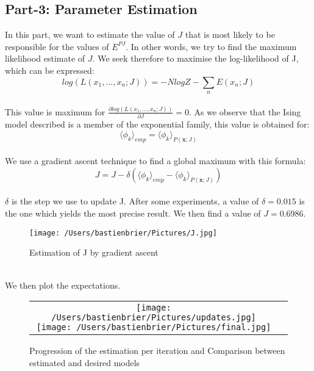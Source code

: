 \documentclass[11pt, oneside]{article}   	%
\begin{document}
	\subsection{Part-3: Parameter Estimation}
		In this part, we want to estimate the value of $J$ that is most likely to be responsible for the values of $E^{PJ}$. In other words, we try to find the maximum likelihood estimate of $J$. We seek therefore to maximise the log-likelihood of J, which can be expressed:
		\[log(L(x_1, ... , x_n;J))= -NlogZ - \sum_nE(x_n;J)\]
		\\ This value is maximum for $\frac{\partial log(L(x_1, ... , x_n;J))}{\partial J} = 0$. As we observe that the Ising model described is a member of the exponential family, this value is obtained for:
		\[\langle \phi_k\rangle_{emp} = \langle \phi_k\rangle_{P(\mathbf x;J)}\]
		\\ We use a gradient ascent technique to find a global maximum with this formula:
		\[J = J - \delta (\langle \phi_k\rangle_{emp} - \langle \phi_k\rangle_{P(\mathbf x;J)})\]
		\\ $\delta$ is the step we use to update J. After some experiments, a value of $\delta = 0.015$ is the one which yields the most precise result. We then find a value of $J = 0.6986$.
		\begin{figure}[h]
			\centering
			\caption{Estimation of J by gradient ascent\label{gradient}}
			\texttt{[image: /Users/bastienbrier/Pictures/J.jpg]}
		\end{figure}
		\\ We then plot the expectations.
		\makeatletter
		\setlength{\@fptop}{0pt}
		\makeatother
		\begin{figure}[t!]
			\centering
			\caption{Progression of the estimation per iteration and Comparison between estimated and desired models}
			\begin{tabular}[t!]{cc}
				\texttt{[image: /Users/bastienbrier/Pictures/updates.jpg]}
				\texttt{[image: /Users/bastienbrier/Pictures/final.jpg]}
			\end{tabular}
		\end{figure}
	
\end{document}
